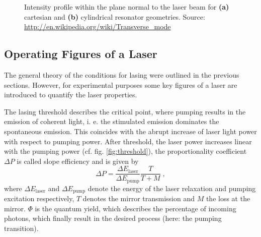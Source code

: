 \documentclass[a4paper]{scrartcl}
\numberwithin{equation}{section}
\numberwithin{figure}{section}
\numberwithin{table}{section}
\newcommand{\eq}[2]{\begin{equation}#1\label{#2}\end{equation}}
\begin{document}
\begin{figure}
\centering
{}
\hfill
{}
\caption{\small Intensity profile within the plane normal to the laser beam for \textbf{(a)} cartesian and \textbf{(b)} cylindrical resonator geometries. Source: \url{http://en.wikipedia.org/wiki/Transverse_mode} }
\label{fig:modes}
\end{figure}

\subsection{Operating Figures of a Laser}
The general theory of the conditions for lasing were outlined in the previous sections. However, for experimental purposes some key figures of a laser are introduced to quantify the laser properties.

The lasing threshold describes the critical point, where pumping results in the emission of coherent light, i. e. the stimulated emission dominates the spontaneous emission. This coincides with the abrupt increase of laser light power with respect to pumping power. After threshold, the laser power increases linear with the pumping power (cf. fig. \ref{fig:threshold}), the proportionality coefficient $\Delta P$ is called slope efficiency and is given by
\eq{\Delta P = \frac{\Delta E_\text{laser}}{\Delta E_\text{pump}} \frac{T}{T+M} \; ,}{slope}
where $\Delta E_\text{laser}$ and $\Delta E_\text{pump}$ denote the energy of the laser relaxation and pumping excitation respectively, $T$ denotes the mirror transmission and $M$ the loss at the mirror. $\Phi$ is the quantum yield, which describes the percentage of incoming photons, which finally result in the desired process (here: the pumping transition). 
\end{document}
